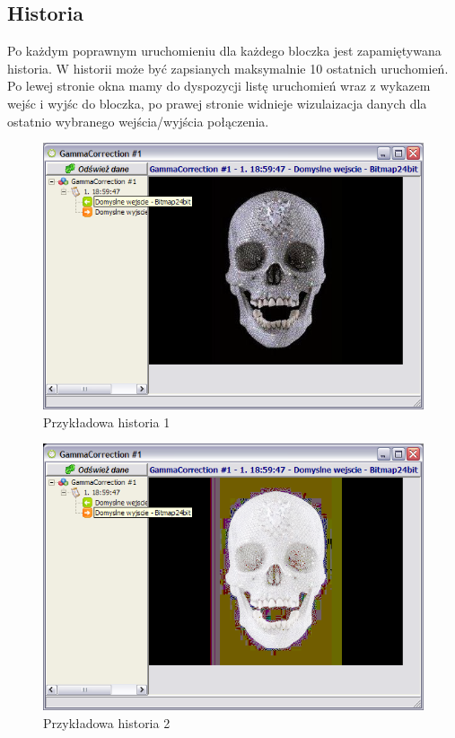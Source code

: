 \documentclass[a4paper,10pt]{article}
\begin{document}
\subsection{Historia}
Po każdym poprawnym uruchomieniu dla każdego bloczka jest zapamiętywana historia. W historii może być zapsianych maksymalnie 10 ostatnich uruchomień. Po lewej stronie okna mamy do dyspozycji listę uruchomień wraz z wykazem wejśc i wyjśc do bloczka, po prawej stronie widnieje wizulaizacja danych dla ostatnio wybranego wejścia/wyjścia połączenia.
\begin{figure}[h]
 \centering
 \includegraphics[scale=0.2]{history1.png}
 \caption{Przykładowa historia 1}
 \label{fig:his1}
\end{figure} 
\begin{figure}[h]
 \centering
 \includegraphics[scale=0.2]{history2.png}
 \caption{Przykładowa historia 2}
 \label{fig:his2}
\end{figure} 
\end{document}
